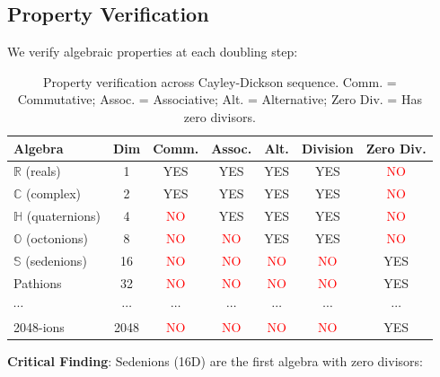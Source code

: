 \subsection{Property Verification}

We verify algebraic properties at each doubling step:

\begin{table}[H]
\centering
\small
\begin{tabular}{lcccccc}
\toprule
\textbf{Algebra} & \textbf{Dim} & \textbf{Comm.} & \textbf{Assoc.} & \textbf{Alt.} & \textbf{Division} & \textbf{Zero Div.} \\
\midrule
$\mathbb{R}$ (reals) & 1 & \textcolor{validcolor}{YES} & \textcolor{validcolor}{YES} & \textcolor{validcolor}{YES} & \textcolor{validcolor}{YES} & \textcolor{red}{NO} \\
$\mathbb{C}$ (complex) & 2 & \textcolor{validcolor}{YES} & \textcolor{validcolor}{YES} & \textcolor{validcolor}{YES} & \textcolor{validcolor}{YES} & \textcolor{red}{NO} \\
$\mathbb{H}$ (quaternions) & 4 & \textcolor{red}{NO} & \textcolor{validcolor}{YES} & \textcolor{validcolor}{YES} & \textcolor{validcolor}{YES} & \textcolor{red}{NO} \\
$\mathbb{O}$ (octonions) & 8 & \textcolor{red}{NO} & \textcolor{red}{NO} & \textcolor{validcolor}{YES} & \textcolor{validcolor}{YES} & \textcolor{red}{NO} \\
$\mathbb{S}$ (sedenions) & 16 & \textcolor{red}{NO} & \textcolor{red}{NO} & \textcolor{red}{NO} & \textcolor{red}{NO} & \textcolor{validcolor}{YES} \\
Pathions & 32 & \textcolor{red}{NO} & \textcolor{red}{NO} & \textcolor{red}{NO} & \textcolor{red}{NO} & \textcolor{validcolor}{YES} \\
$\cdots$ & $\cdots$ & $\cdots$ & $\cdots$ & $\cdots$ & $\cdots$ & $\cdots$ \\
2048-ions & 2048 & \textcolor{red}{NO} & \textcolor{red}{NO} & \textcolor{red}{NO} & \textcolor{red}{NO} & \textcolor{validcolor}{YES} \\
\bottomrule
\end{tabular}
\caption{Property verification across Cayley-Dickson sequence. Comm. = Commutative; Assoc. = Associative; Alt. = Alternative; Zero Div. = Has zero divisors.}
\label{tab:cayley_dickson_properties}
\end{table}

\textbf{Critical Finding}: Sedenions (16D) are the first algebra with zero divisors:

